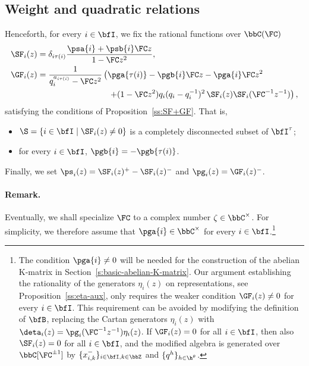 \documentclass[reqno]{amsart}
\numberwithin{equation}{section}
\newenvironment{remark}{\medskip\paragraph{{\bf Remark.}}}{\par\medskip}
\begin{document}
\subsection{Weight and quadratic relations}\label{ss:weight-quadratic-relations}
Henceforth, for every $i\in\bfI$, we fix the rational functions over $\bbC(\FC)$
\begin{equation}\label{eq:SF+GF}
\begin{aligned}
	\SF_i(z)&=\delta_{i\tau(i)}\frac{\psa{i}+\psb{i}\FC z}{1-\FC z^2},\\
	\GF_i(z)&=
		\frac{1}{q_i^{a_{i\tau(i)}}-\FC z^2}\left(
		\pga{\tau(i)}-\pgb{i}\FC z-\pga{i}\FC z^2\right.\\
		&\hspace{3cm}\left.+
		(1-\FC z^2)q_i(q_i-q_i^{-1})^2\,\SF_i(z)\SF_{i}(\FC^{-1}z^{-1})\right),
\end{aligned}
\end{equation}
satisfying the conditions of Proposition~\ref{ss:SF+GF}. That is,
\begin{itemize}\itemsep0.25cm
	\item $\S=\{i\in\bfI\mid\SF_i(z)\neq0\}$ is a completely disconnected subset of $\bfI^\tau$;
	\item for every $i\in\bfI$, $\pgb{i}=-\pgb{\tau(i)}$.
\end{itemize}
Finally, we set $\ps_i(z)=\SF_i(z)^+-\SF_i(z)^-$ and $\pg_i(z)=\GF_i(z)^-$.

\begin{remark}
Eventually, we shall specialize $\FC$ to a complex number
$\zeta\in\bbC^\times$. For simplicity, we therefore assume that
$\pga{i}\in\bbC^\times$ for every $i\in\bfI$.\footnote{
	The condition $\pga{i}\neq0$ will be needed for the
	construction of the abelian K-matrix in
	Section~\ref{s:basic-abelian-K-matrix}.
	Our argument establishing the rationality of the generators
	$\eta_i(z)$ on representations, see Proposition~\ref{ss:eta-aux}, only requires the weaker condition $\GF_i(z)\neq0$ for every $i\in\bfI$. 
	This requirement can be avoided by modifying the definition of $\bfB$, 
	replacing the Cartan generators $\eta_i(z)$ with
	$\deta_i(z)=\pg_i(\FC^{-1}z^{-1})\eta_i(z)$.
	If $\GF_i(z)=0$ for all $i\in\bfI$, then also $\SF_i(z)=0$
	for all $i\in\bfI$, and the modified algebra is generated over
	$\bbC[\FC^{\pm1}]$ by $\{x^-_{i,k}\}_{i\in\bfI, k\in\bbZ}$
	and $\{q^h\}_{h\in\h^{\theta}}$.
}
\hfill\rmkend
\end{remark}
\end{document}
